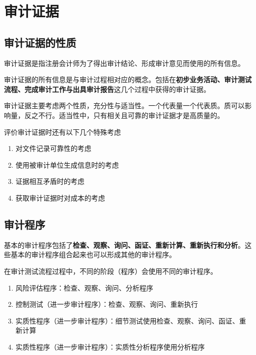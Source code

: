 \documentclass[UTF8,12pt]{ctexart}
\numberwithin{equation}{section} %
\numberwithin{figure}{section}
\numberwithin{table}{section}
\begin{document}
	
	\newpage
	\section{审计证据}	
	\subsection{审计证据的性质}
	审计证据是指注册会计师为了得出审计结论、形成审计意见而使用的所有信息。
	
	审计证据的所有信息是与审计过程相对应的概念。包括在\textbf{初步业务活动、审计测试流程、完成审计工作与出具审计报告}这几个过程中获得的审计证据。
	
	审计证据主要考虑两个性质，充分性与适当性。一个代表量一个代表质。质可以影响量，反之不行。适当性中，只有相关且可靠的审计证据才是高质量的。
	
	评价审计证据时还有以下几个特殊考虑
	\begin{enumerate}
		\item 对文件记录可靠性的考虑
		
		\item 使用被审计单位生成信息时的考虑
		
		\item 证据相互矛盾时的考虑
		
		\item 获取审计证据时对成本的考虑
	\end{enumerate}
	
	\subsection{审计程序}
	基本的审计程序包括了\textbf{检查、观察、询问、函证、重新计算、重新执行和分析}。这些基本的审计程序组合起来也可以形成其他的审计程序。
	
	在审计测试流程过程中，不同的阶段（程序）会使用不同的审计程序。
	\begin{enumerate}
		\item 风险评估程序：检查、观察、询问、分析程序
		
		\item 控制测试（进一步审计程序）：检查、观察、询问、重新执行
		
		\item 实质性程序（进一步审计程序）：细节测试使用检查、观察、询问、函证、重新计算
		
		\item 实质性程序（进一步审计程序）：实质性分析程序使用分析程序
	\end{enumerate}
	
\end{document}
